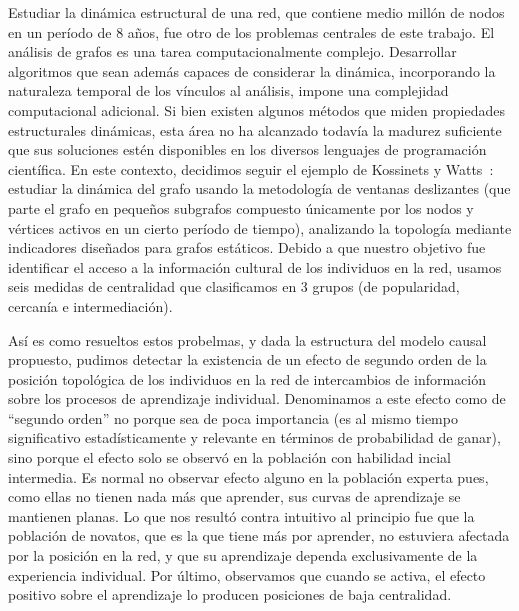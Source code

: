 \documentclass[a4paper,11pt]{book}
\theoremstyle{definition}
\begin{document}
Estudiar la dinámica estructural de una red, que contiene medio millón de nodos en un período de 8 años, fue otro de los problemas centrales de este trabajo.
%
El análisis de grafos es una tarea computacionalmente complejo.
%
Desarrollar algoritmos que sean además capaces de considerar la dinámica, incorporando la naturaleza temporal de los vínculos al análisis, impone una complejidad computacional adicional.
%
Si bien existen algunos métodos que miden propiedades estructurales dinámicas, esta área no ha alcanzado todavía la madurez suficiente que sus soluciones estén disponibles en los diversos lenguajes de programación científica.
%
En este contexto, decidimos seguir el ejemplo de Kossinets y Watts~\cite{Kossinets2006}: estudiar la dinámica del grafo usando la metodología de ventanas deslizantes (que parte el grafo en pequeños subgrafos compuesto únicamente por los nodos y vértices activos en un cierto período de tiempo), analizando la topología mediante indicadores diseñados para grafos estáticos.
%
Debido a que nuestro objetivo fue identificar el acceso a la información cultural de los individuos en la red, usamos seis medidas de centralidad que clasificamos en 3 grupos (de popularidad, cercanía e intermediación).

Así es como resueltos estos probelmas, y dada la estructura del modelo causal propuesto, pudimos detectar la existencia de un efecto de segundo orden de la posición topológica de los individuos en la red de intercambios de información sobre los procesos de aprendizaje individual.
%
Denominamos a este efecto como de ``segundo orden'' no porque sea de poca importancia (es al mismo tiempo significativo estadísticamente y relevante en términos de probabilidad de ganar), sino porque el efecto solo se observó en la población con habilidad incial intermedia.
%
Es normal no observar efecto alguno en la población experta pues, como ellas no tienen nada más que aprender, sus curvas de aprendizaje se mantienen planas.
%
Lo que nos resultó contra intuitivo al principio fue que la población de novatos, que es la que tiene más por aprender, no estuviera afectada por la posición en la red, y que su aprendizaje dependa exclusivamente de la experiencia individual.
%
Por último, observamos que cuando se activa, el efecto positivo sobre el aprendizaje lo producen posiciones de baja centralidad.
\end{document}
